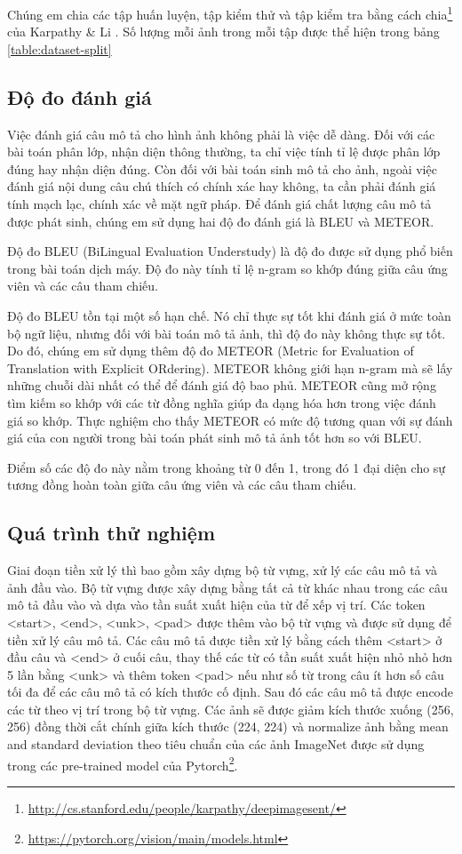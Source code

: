 \documentclass[conference]{IEEEtran}
\begin{document}
Chúng em chia các tập huấn luyện, tập kiểm thử và tập kiểm tra bằng cách chia\footnote{\url{http://cs.stanford.edu/people/karpathy/deepimagesent/}} của Karpathy \& Li \cite{karpathy2015deep}.
Số lượng mỗi ảnh trong mỗi tập được thể hiện trong bảng \ref{table:dataset-split}


\subsection{Độ đo đánh giá}
Việc đánh giá câu mô tả cho hình ảnh không phải là việc dễ dàng. Đối với các bài toán phân lớp, nhận diện thông thường, ta chỉ việc tính tỉ lệ được phân lớp đúng hay nhận diện đúng. Còn đối với bài toán sinh mô tả cho ảnh, ngoài việc đánh giá nội dung câu chú thích có chính xác hay không, ta cần phải đánh giá tính mạch lạc, chính xác về mặt ngữ pháp. Để đánh giá chất lượng câu mô tả được phát sinh, chúng em sử dụng hai độ đo đánh giá là BLEU\cite{papineni2002bleu} và METEOR\cite{banerjee2005meteor}.

Độ đo BLEU (BiLingual Evaluation Understudy) là độ đo được sử dụng phổ biến trong bài toán dịch máy.
Độ đo này tính tỉ lệ n-gram so khớp đúng giữa câu ứng viên và các câu tham chiếu. 

Độ đo BLEU tồn tại một số hạn chế.
Nó chỉ thực sự tốt khi đánh giá ở mức toàn bộ ngữ liệu, nhưng đối với bài toán mô tả ảnh, thì độ đo này không thực sự tốt.
Do đó, chúng em sử dụng thêm độ đo METEOR  (Metric for Evaluation of Translation with Explicit ORdering).
METEOR không giới hạn n-gram mà sẽ lấy những chuỗi dài nhất có thể để đánh giá độ bao phủ.
METEOR cũng mở rộng tìm kiếm so khớp với các từ đồng nghĩa giúp đa dạng hóa hơn trong việc đánh giá so khớp.
Thực nghiệm cho thấy METEOR có mức độ tương quan với sự đánh giá của con người trong bài toán phát sinh mô tả ảnh tốt hơn so với BLEU.

Điểm số các độ đo này nằm trong khoảng từ 0 đến 1, trong đó 1 đại diện cho sự tương đồng hoàn toàn giữa câu ứng viên và các câu tham chiếu.

\subsection{Quá trình thử nghiệm\label{implement}}
Giai đoạn tiền xử lý thì bao gồm xây dựng bộ từ vựng, xử lý các câu mô tả và ảnh đầu vào. Bộ từ vựng được xây dựng bằng tất cả từ khác nhau trong các câu mô tả đầu vào và dựa vào tần suất xuất hiện của từ để xếp vị trí. Các token <start>, <end>, <unk>, <pad> được thêm vào bộ từ vựng và được sử dụng để tiền xử lý câu mô tả. Các câu mô tả được tiền xử lý bằng cách thêm <start> ở đầu câu và <end> ở cuối câu, thay thế các từ có tần suất xuất hiện nhỏ nhỏ hơn 5 lần bằng <unk> và thêm token <pad> nếu như số từ trong câu ít hơn số câu tối đa để các câu mô tả có kích thước cố định. Sau đó các câu mô tả được encode các từ theo vị trí trong bộ từ vựng. 
Các ảnh sẽ được giảm kích thước xuống (256, 256) đồng thời cắt chính giữa kích thước (224, 224) và normalize ảnh bằng mean and standard deviation theo tiêu chuẩn của các ảnh ImageNet được sử dụng trong các pre-trained model của Pytorch\footnote{\label{pytorch}\url{https://pytorch.org/vision/main/models.html}}.  
\end{document}
